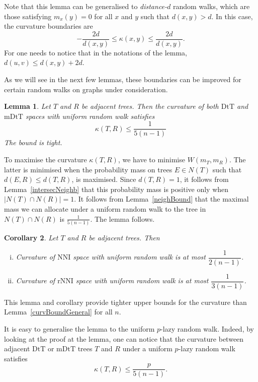 \documentclass{amsart}
\newtheorem{lemma}{Lemma}
\newtheorem{corollary}[lemma]{Corollary}
\newcommand{\dts}{\mathrm{DtT}}
\newcommand{\nni}{\mathrm{NNI}}
\newcommand{\rnni}{\mathrm{rNNI}}
\newcommand{\mdts}{\mathrm{mDtT}}
\begin{document}
Note that this lemma can be generalised to {\em distance-$d$} random walks, 
which are those satisfying $m_x(y) = 0$ for all $x$ and $y$ such that 
$d(x,y) > d$. In this case, the curvature boundaries are 
\[
-\dfrac{2d}{d(x,y)} \leq \kappa(x,y) \leq \dfrac{2d}{d(x,y)}.
\]
For one needs to notice that in the notations of the lemma, 
$d(u,v) \leq d(x,y) + 2d$. 

As we will see in the next few lemmas, these boundaries can be improved for certain random walks on graphs under consideration. 

\begin{lemma}\label{uniformUpper}
Let $T$ and $R$ be adjacent trees. 
Then the curvature of both $\dts$ and $\mdts$ spaces with uniform random walk satisfies 
\[
\kappa(T,R) \leq \dfrac{1}{5(n-1)}
\]
The bound is tight. 
\end{lemma}

\proof
To maximise the curvature $\kappa(T,R)$, we have to minimise $W(m_T,m_R)$. 
The latter is minimised when the probability mass on trees $E \in N(T)$ 
such that
$d(E,R) \leq d(T,R)$, is maximised. Since $d(T,R) = 1$, it follows from 
Lemma~\ref{intersecNeighb} that this probability mass is positive only
when $|N(T) \cap N(R)| = 1$. It follows from Lemma~\ref{neighBound} that
the maximal mass we can allocate under a uniform random walk to the tree in 
$N(T) \cap N(R)$ is $\frac{1}{5(n-1)}$. The lemma follows. 
\endproof

\begin{corollary}
Let $T$ and $R$ be adjacent trees. 
Then 
\begin{enumerate}[(i)]
\item Curvature of $\nni$ space with uniform random walk is at most $\dfrac{1}{2(n-1)}$.
\item Curvature of $\rnni$ space with uniform random walk is at most $\dfrac{1}{3(n-1)}$.
\end{enumerate}
\end{corollary}

This lemma and corollary provide tighter upper bounds for the curvature than Lemma~\ref{curvBoundGeneral} for all $n$. 

It is easy to generalise the lemma to the uniform $p$-lazy random walk. 
Indeed, by looking at the proof at the lemma, one can notice that the curvature between adjacent $\dts$ or $\mdts$ trees $T$ and $R$ under a uniform $p$-lazy random walk 
satisfies 
\[
\kappa(T,R) \leq \frac{p}{5(n-1)}.
\]
\end{document}
